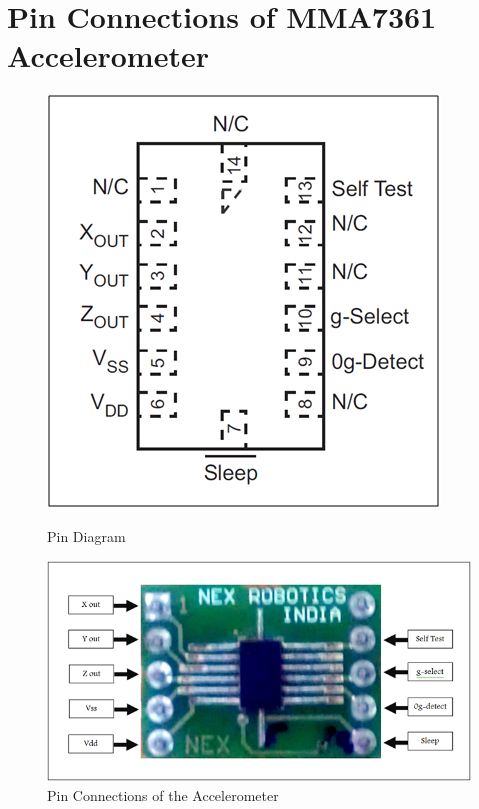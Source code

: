 \documentclass[a4paper,12 pt]{article}
\begin{document}
\pagebreak

\section{Pin Connections of MMA7361 Accelerometer }
\vspace {5 mm}
\begin{figure}[h]
\begin{center}
\includegraphics[]{acc1.png}
\caption{Pin Diagram}
\label{fig:2}

\includegraphics[]{acc2.png}
\caption{Pin Connections of the Accelerometer}
\label{fig:3}
\end{center}
\end{figure}
\end{document}
